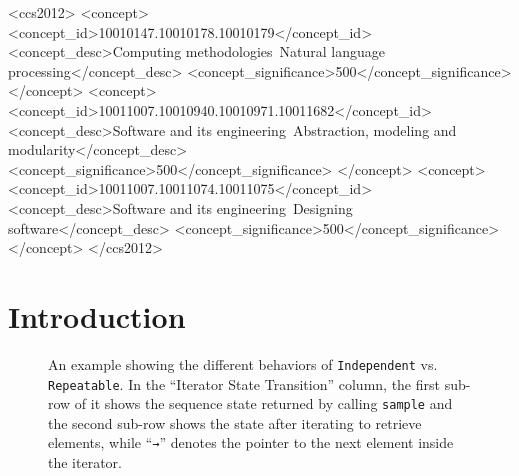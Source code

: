 \documentclass[sigconf]{acmart}
\begin{document}
\begin{CCSXML}
<ccs2012>
   <concept>
       <concept_id>10010147.10010178.10010179</concept_id>
       <concept_desc>Computing methodologies~Natural language processing</concept_desc>
       <concept_significance>500</concept_significance>
       </concept>
   <concept>
       <concept_id>10011007.10010940.10010971.10011682</concept_id>
       <concept_desc>Software and its engineering~Abstraction, modeling and modularity</concept_desc>
       <concept_significance>500</concept_significance>
       </concept>
   <concept>
       <concept_id>10011007.10011074.10011075</concept_id>
       <concept_desc>Software and its engineering~Designing software</concept_desc>
       <concept_significance>500</concept_significance>
       </concept>
 </ccs2012>
\end{CCSXML}




\maketitle

\section{Introduction}

\begin{figure}[htbp]
  \begin{center}
    
  \end{center} 
  \caption{An example showing the different behaviors of \texttt{Independent} vs. \texttt{Repeatable}. In the ``Iterator State Transition'' column, the first sub-row of it shows the sequence state returned by calling \texttt{sample} and the second sub-row shows the state after iterating to retrieve elements, while ``\texttt{→}'' denotes the pointer to the next element inside the iterator.}
  \vspace{-3mm}
  \label{fig:example}
\end{figure}
\end{document}
